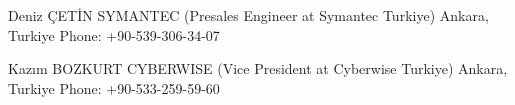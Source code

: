 

\begin{cventries}

  \cventry
    {Deniz ÇETİN} %
    {SYMANTEC (Presales Engineer at Symantec Turkiye)} %
    {Ankara, Turkiye} %
    {Phone: +90-539-306-34-07} %

  \cventry
    {Kazım BOZKURT} %
    {CYBERWISE (Vice President at Cyberwise Turkiye)} %
    {Ankara, Turkiye} %
    {Phone: +90-533-259-59-60} %
\end{cventries}
